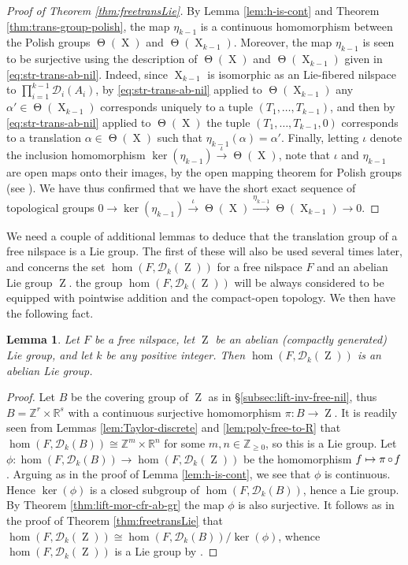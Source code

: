 \documentclass[a4paper,12pt,reqno]{amsart}
\newtheorem{lemma}[theorem]{Lemma}
\theoremstyle{definition}
\def\to{\rightarrow}
\newcommand{\mc}{\mathcal}
\newcommand{\mb}{\mathbb}
\DeclareMathOperator{\ab}{Z}
\DeclareMathOperator{\tran}{\Theta}
\DeclareMathOperator{\ns}{X}
\DeclareMathOperator{\co}{\circ\hspace{-0.02 cm}}
\begin{document}
\begin{proof}[Proof of Theorem \ref{thm:freetransLie}]
By Lemma \ref{lem:h-is-cont} and Theorem \ref{thm:trans-group-polish}, the map $\eta_{k-1}$ is a continuous homomorphism between the Polish groups $\tran(\ns)$ and $\tran(\ns_{k-1})$. Moreover, the map $\eta_{k-1}$ is seen to be surjective using the description of $\tran(\ns)$ and $\tran(\ns_{k-1})$ given in \eqref{eq:str-trans-ab-nil}. Indeed, since $\ns_{k-1}$ is isomorphic as an Lie-fibered nilspace to $\prod_{i=1}^{k-1}\mc{D}_i(A_i)$, by \eqref{eq:str-trans-ab-nil} applied to $\tran(\ns_{k-1})$ any $\alpha'\in \tran(\ns_{k-1})$ corresponds uniquely to a tuple $(T_1,\ldots,T_{k-1})$, and then by \eqref{eq:str-trans-ab-nil} applied to $\tran(\ns)$ the tuple $(T_1,\ldots,T_{k-1},0)$ corresponds to a translation $\alpha\in \tran(\ns)$ such that $\eta_{k-1}(\alpha)=\alpha'$. Finally, letting $\iota$ denote the inclusion homomorphism $\ker(\eta_{k-1}) \xrightarrow{\iota} \tran(\ns)$, note that $\iota$ and $\eta_{k-1}$ are open maps onto their images, by the open mapping theorem for Polish groups (see \cite[Chapter 1]{BeKe}). We have thus confirmed that we have the short exact sequence of topological groups $0\to \ker(\eta_{k-1}) \xrightarrow{\iota} \tran(\ns) \xrightarrow{\eta_{k-1}}\tran(\ns_{k-1})\to 0$. 
\end{proof}
We need a couple of additional  lemmas to deduce that the translation group of a free nilspace is a Lie group. The first of these will also be used several times later, and concerns the set $\hom(F,\mc{D}_k(\ab))$ for a free nilspace $F$ and an abelian Lie group $\ab$. the group $\hom(F,\mc{D}_k(\ab))$ will be always considered to be equipped with pointwise addition and the compact-open topology. We then have the following fact.
\begin{lemma}\label{lem:hom-Lie}
Let $F$ be a free nilspace, let $\ab$ be an abelian \textup{(}compactly generated\textup{)} Lie group, and let $k$ be any positive integer. Then $\hom(F,\mc{D}_k(\ab))$ is an abelian Lie group.
\end{lemma}
\begin{proof}
Let $B$ be the covering group of $\ab$ as in \S \ref{subsec:lift-inv-free-nil}, thus $B=\mb{Z}^r\times \mb{R}^s$ with a continuous surjective homomorphism $\pi:B\to \ab$. It is readily seen from Lemmas  \ref{lem:Taylor-discrete} and \ref{lem:poly-free-to-R} that $\hom(F,\mc{D}_k(B))\cong \mb{Z}^m\times \mb{R}^n$ for some $m,n\in\mb{Z}_{\ge 0}$, so this is a Lie group. Let $\phi:\hom(F,\mc{D}_k(B))\to \hom(F,\mc{D}_k(\ab))$ be the homomorphism $f\mapsto \pi\co f$. Arguing as in the proof of Lemma \ref{lem:h-is-cont}, we see that $\phi$ is continuous. Hence $\ker(\phi)$ is a closed subgroup of $\hom(F,\mc{D}_k(B))$, hence a Lie group. By Theorem \ref{thm:lift-mor-cfr-ab-gr} the map $\phi$ is also surjective. It follows as in the proof of Theorem \ref{thm:freetransLie} that $\hom(F,\mc{D}_k(\ab))\cong \hom(F,\mc{D}_k(B))/\ker(\phi)$, whence $\hom(F,\mc{D}_k(\ab))$ is a Lie group by \cite[Theorem 2.6]{Mosk}.
\end{proof}
\end{document}
